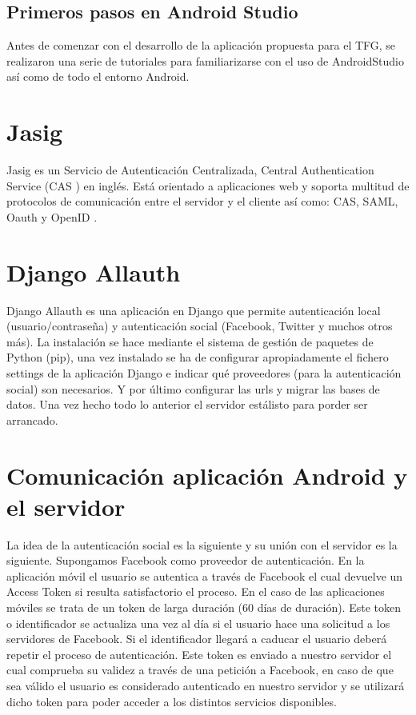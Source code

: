 \subsection{Primeros pasos en Android Studio}

Antes de comenzar con el desarrollo de la aplicación propuesta para el TFG, se 
realizaron una serie de tutoriales \cite{URL::GettingStarted, URL::SavingData} 
para familiarizarse con el uso de AndroidStudio así como de todo el entorno Android.

\section{Jasig}

Jasig \cite{URL::Jasig} es un Servicio de Autenticación Centralizada, Central 
Authentication Service (CAS \cite{URL::CAS}) en inglés.  
Está orientado a aplicaciones web y soporta multitud de protocolos de comunicación 
entre el servidor y el cliente así como: 
CAS, SAML, Oauth \cite{URL::Oauth} y OpenID \cite{URL::OpenID}.

\section{Django Allauth}

Django Allauth \cite{URL::allauth} es una aplicación en Django \cite{URL::Django} 
que permite autenticación local (usuario/contraseña) y autenticación social 
(Facebook, Twitter y muchos otros más). La instalación se hace mediante el 
sistema de gestión de paquetes de Python \cite{URL::Python} (pip), 
una vez instalado se ha de configurar apropiadamente el fichero settings de la 
aplicación Django e indicar qué proveedores (para la autenticación social) son 
necesarios. Y por último configurar las urls y migrar las bases de datos. Una vez 
hecho todo lo anterior el servidor estálisto para porder ser arrancado.

\section{Comunicación aplicación Android y el servidor}
La idea de la autenticación social es la siguiente y su unión con el servidor es 
la siguiente. Supongamos Facebook como proveedor de autenticación. En la aplicación 
móvil el usuario se autentica a través de Facebook el cual devuelve un Access Token
si resulta satisfactorio el proceso. En el caso de las aplicaciones móviles se trata 
de un token de larga duración (60 días de duración). Este token o identificador 
se actualiza una vez al día si el usuario hace una solicitud a los servidores de 
Facebook. Si el identificador llegará a caducar el usuario deberá repetir el proceso
de autenticación. Este token es enviado a nuestro servidor el cual comprueba su validez
a través de una petición a Facebook, en caso de que sea válido el usuario es considerado
autenticado en nuestro servidor y se utilizará dicho token para poder acceder a los 
distintos servicios disponibles.

